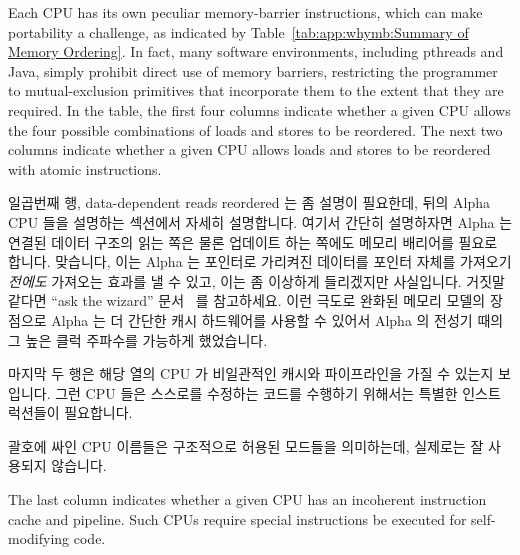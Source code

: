 Each CPU has its own peculiar memory-barrier instructions, which
can make portability a challenge, as indicated by
Table~\ref{tab:app:whymb:Summary of Memory Ordering}.
In fact, many software environments,
including pthreads and Java, simply prohibit
direct use of memory barriers, restricting the programmer to mutual-exclusion
primitives that incorporate them to the extent that they are required.
In the table,
the first four columns indicate whether a given CPU allows the four
possible combinations of loads and stores to be reordered.
The next two columns indicate whether a given CPU allows loads and stores
to be reordered with atomic instructions.
\fi

일곱번째 행, data-dependent reads reordered 는 좀 설명이 필요한데, 뒤의 Alpha
CPU 들을 설명하는 섹션에서 자세히 설명합니다.
여기서 간단히 설명하자면 Alpha 는 연결된 데이터 구조의 읽는 쪽은 물론 업데이트
하는 쪽에도 메모리 배리어를 필요로 합니다.
맞습니다, 이는 Alpha 는 포인터로 가리켜진 데이터를 포인터 자체를 가져오기 {\em
전에도} 가져오는 효과를 낼 수 있고, 이는 좀 이상하게 들리겠지만 사실입니다.
거짓말 같다면 ``ask the wizard'' 문서~\cite{Compaq01} 를 참고하세요.
이런 극도로 완화된 메모리 모델의 장점으로 Alpha 는 더 간단한 캐시 하드웨어를
사용할 수 있어서 Alpha 의 전성기 때의 그 높은 클럭 주파수를 가능하게
했었습니다.

마지막 두 행은 해당 열의 CPU 가 비일관적인 캐시와 파이프라인을 가질 수 있는지
보입니다.
그런 CPU 들은 스스로를 수정하는 코드를 수행하기 위해서는 특별한 인스트럭션들이
필요합니다.

괄호에 싸인 CPU 이름들은 구조적으로 허용된 모드들을 의미하는데, 실제로는 잘
사용되지 않습니다.
\iffalse

The last column indicates whether a given CPU has an incoherent
instruction cache and pipeline.
Such CPUs require special instructions be executed for self-modifying
code.

